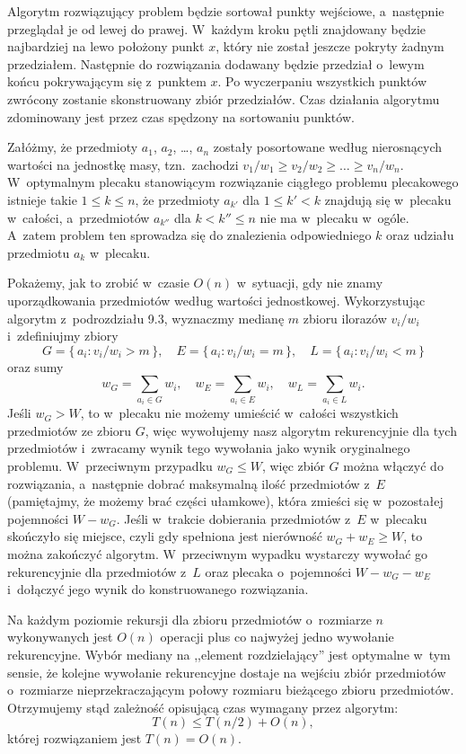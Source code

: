 Algorytm rozwiązujący problem będzie sortował punkty wejściowe, a~następnie przeglądał je od lewej do prawej.
W~każdym kroku pętli znajdowany będzie najbardziej na lewo położony punkt $x$, który nie został jeszcze pokryty żadnym przedziałem.
Następnie do rozwiązania dodawany będzie przedział o~lewym końcu pokrywającym się z~punktem $x$.
Po wyczerpaniu wszystkich punktów zwrócony zostanie skonstruowany zbiór przedziałów.
Czas działania algorytmu zdominowany jest przez czas spędzony na sortowaniu punktów.

\exercise %
Załóżmy, że przedmioty $a_1$, $a_2$, \dots, $a_n$ zostały posortowane według nierosnących wartości na jednostkę masy, tzn.\ zachodzi $v_1/w_1\ge v_2/w_2\ge\dots\ge v_n/w_n$.
W~optymalnym plecaku stanowiącym rozwiązanie ciągłego problemu plecakowego istnieje takie $1\le k\le n$, że przedmioty $a_{k'}$ dla $1\le k'<k$ znajdują się w~plecaku w~całości, a~przedmiotów $a_{k''}$ dla $k<k''\le n$ nie ma w~plecaku w~ogóle.
A~zatem problem ten sprowadza się do znalezienia odpowiedniego $k$ oraz udziału przedmiotu $a_k$ w~plecaku.

Pokażemy, jak to zrobić w~czasie $O(n)$ w~sytuacji, gdy nie znamy uporządkowania przedmiotów według wartości jednostkowej.
Wykorzystując algorytm  z~podrozdziału 9.3, wyznaczmy medianę $m$ zbioru ilorazów $v_i/w_i$ i~zdefiniujmy zbiory
\[
	G = \{\,a_i:v_i/w_i>m\,\}, \quad E = \{\,a_i:v_i/w_i=m\,\}, \quad L = \{\,a_i:v_i/w_i<m\,\}
\]
oraz sumy
\[
	w_G = \sum_{a_i\in G}w_i, \quad w_E = \sum_{a_i\in E}w_i, \quad w_L = \sum_{a_i\in L}w_i.
\]
Jeśli $w_G>W$, to w~plecaku nie możemy umieścić w~całości wszystkich przedmiotów ze zbioru $G$, więc wywołujemy nasz algorytm rekurencyjnie dla tych przedmiotów i~zwracamy wynik tego wywołania jako wynik oryginalnego problemu.
W~przeciwnym przypadku $w_G\le W$, więc zbiór $G$ można włączyć do rozwiązania, a~następnie dobrać maksymalną ilość przedmiotów z~$E$ (pamiętajmy, że możemy brać części ułamkowe), która zmieści się w~pozostałej pojemności $W-w_G$.
Jeśli w~trakcie dobierania przedmiotów z~$E$ w~plecaku skończyło się miejsce, czyli gdy spełniona jest nierówność $w_G+w_E\ge W$, to można zakończyć algorytm.
W~przeciwnym wypadku wystarczy wywołać go rekurencyjnie dla przedmiotów z~$L$ oraz plecaka o~pojemności $W-w_G-w_E$ i~dołączyć jego wynik do konstruowanego rozwiązania.

Na każdym poziomie rekursji dla zbioru przedmiotów o~rozmiarze $n$ wykonywanych jest $O(n)$ operacji plus co najwyżej jedno wywołanie rekurencyjne.
Wybór mediany na ,,element rozdzielający'' jest optymalne w~tym sensie, że kolejne wywołanie rekurencyjne dostaje na wejściu zbiór przedmiotów o~rozmiarze nieprzekraczającym połowy rozmiaru bieżącego zbioru przedmiotów.
Otrzymujemy stąd zależność opisującą czas wymagany przez algorytm:
\[
	T(n) \le T(n/2)+O(n),
\]
której rozwiązaniem jest $T(n)=O(n)$.

